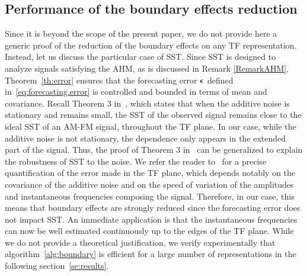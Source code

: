 \subsection{Performance of the boundary effects reduction}
\label{sse:perf.BoundEffRed}
Since it is beyond the scope of the present paper, we do not provide here a generic proof of the reduction of the boundary effects on any TF representation. Instead, let us discuss the particular case of SST. Since SST is designed to analyze signals satisfying the AHM, as is discussed in Remark \ref{RemarkAHM}, Theorem~\ref{th:error} ensures that the forecasting error $\boldsymbol{\epsilon}$ defined in~\eqref{eq:forecasting.error} is controlled and bounded in terms of mean and covariance. Recall Theorem 3 in~\cite{Chen14nonparametric}, which states that when the additive noise is stationary and remains small, the SST of the observed signal remains close to the ideal SST of an AM-FM signal, throughout the TF plane. In our case, while the additive noise is not stationary, the dependence only appears in the extended part of the signal. Thus, the proof of Theorem 3 in~\cite{Chen14nonparametric} can be generalized to explain the robustness of SST to the noise. We refer the reader to~\cite{Chen14nonparametric} for a precise quantification of the error made in the TF plane, which depends notably on the covariance of the additive noise and on the speed of variation of the amplitudes and instantaneous frequencies composing the signal. Therefore, in our case, this means that boundary effects are strongly reduced since the forecasting error does not impact SST. An immediate application is that the instantaneous frequencies can now be well estimated continuously up to the edges of the TF plane.
While we do not provide a theoretical justification, we verify experimentally that algorithm~\ref{alg:boundary} is efficient for a large number of representations in the following section~\ref{se:results}.